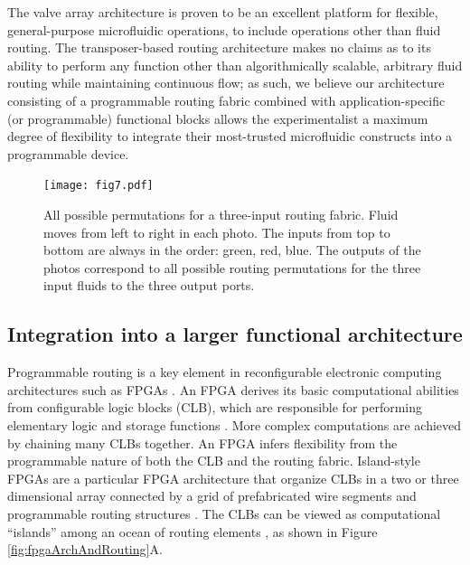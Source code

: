 The valve array architecture is proven to be an excellent platform for flexible, general-purpose microfluidic operations, to include operations other than fluid routing. The transposer-based routing architecture makes no claims as to its ability to perform any function other than algorithmically scalable, arbitrary fluid routing while maintaining continuous flow; as such, we believe our architecture consisting of a programmable routing fabric combined with application-specific (or programmable) functional blocks allows the experimentalist a maximum degree of flexibility to integrate their most-trusted microfluidic constructs into a programmable device.
\begin{figure}[h]
     \begin{minipage}[t]{0.99\linewidth}\centering
      \texttt{[image: fig7.pdf]}
      \medskip
     \end{minipage}\hfill
     \caption[Photographs of all possible permutations for a three-input routing fabric]{All possible permutations for a three-input routing fabric. Fluid moves from left to right in each photo. The inputs from top to bottom are always in the order: green, red, blue. The outputs of the photos correspond to all possible routing permutations for the three input fluids to the three output ports.}
	\label{fig:routes}
\end{figure}



\subsection{Integration into a larger functional architecture}
Programmable routing is a key element in reconfigurable electronic computing architectures such as FPGAs \cite{compton2002reconfigurable}. An FPGA derives its basic computational abilities from configurable logic blocks (CLB), which are responsible for performing elementary logic and storage functions \cite{farooq2012tree}. More complex computations are achieved by chaining many CLBs together. An FPGA infers flexibility from the programmable nature of both the CLB and the routing fabric. Island-style FPGAs \cite{schmit2005extra} are a particular FPGA architecture that organize CLBs in a two \cite{chang1996universal} or three dimensional \cite{alexander1995three} array connected by a grid of prefabricated wire segments and programmable routing structures \cite{chang1996universal}. The CLBs can be viewed as computational ``islands'' among an ocean of routing elements \cite{farooq2012tree}, as shown in Figure \ref{fig:fpgaArchAndRouting}A. 

